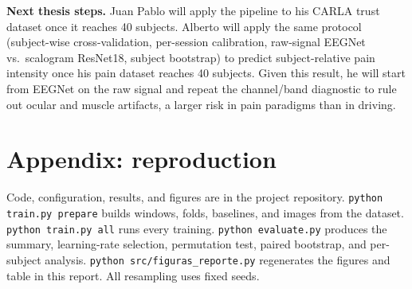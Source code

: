 \documentclass[conference]{IEEEtran}
\begin{document}
\textbf{Next thesis steps.} Juan Pablo will apply the pipeline to his CARLA trust dataset once it reaches 40 subjects. Alberto will apply the same protocol (subject-wise cross-validation, per-session calibration, raw-signal EEGNet vs.\ scalogram ResNet18, subject bootstrap) to predict subject-relative pain intensity once his pain dataset reaches 40 subjects. Given this result, he will start from EEGNet on the raw signal and repeat the channel/band diagnostic to rule out ocular and muscle artifacts, a larger risk in pain paradigms than in driving.




\appendix
\section*{Appendix: reproduction}
Code, configuration, results, and figures are in the project repository. \texttt{python train.py prepare} builds windows, folds, baselines, and images from the dataset. \texttt{python train.py all} runs every training. \texttt{python evaluate.py} produces the summary, learning-rate selection, permutation test, paired bootstrap, and per-subject analysis. \texttt{python src/figuras\_reporte.py} regenerates the figures and table in this report. All resampling uses fixed seeds.
\end{document}
